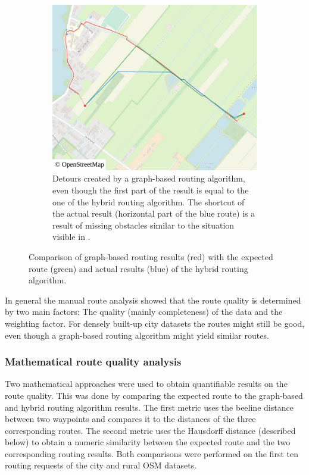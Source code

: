 \begin{figure}[h!]
\begin{minipage}[t]{.48\textwidth}
\begin{subfigure}[t]{\linewidth}
						\includegraphics[width=\textwidth]{images/qgis-routing-rural-routing-17-graph-based}
						\caption{Detours created by a graph-based routing algorithm, even though the first part of the result is equal to the one of the hybrid routing algorithm. The shortcut of the actual result (horizontal part of the blue route) is a result of missing obstacles similar to the situation visible in .}
						\label{fig:eval-rural-graph-based-comparison-17}
					\end{subfigure}
				\end{minipage}
				\caption{Comparison of graph-based routing results (red) with the expected route (green) and actual results (blue) of the hybrid routing algorithm.}
				\label{fig:eval-rural-graph-based-comparison}
			\end{figure}
			
			In general the manual route analysis showed that the route quality is determined by two main factors:
			The quality (mainly completeness) of the data and the weighting factor.
			For densely built-up city datasets the routes might still be good, even though a graph-based routing algorithm might yield similar routes.
		
		\subsubsection{Mathematical route quality analysis}
		
			Two mathematical approaches were used to obtain quantifiable results on the route quality.
			This was done by comparing the expected route to the graph-based and hybrid routing algorithm results.
			The first metric uses the beeline distance between two waypoints and compares it to the distances of the three corresponding routes.
			The second metric uses the Hausdorff distance (described below) to obtain a numeric similarity between the expected route and the two corresponding routing results.
			Both comparisons were performed on the first ten routing requests of the city and rural OSM datasets.
			
